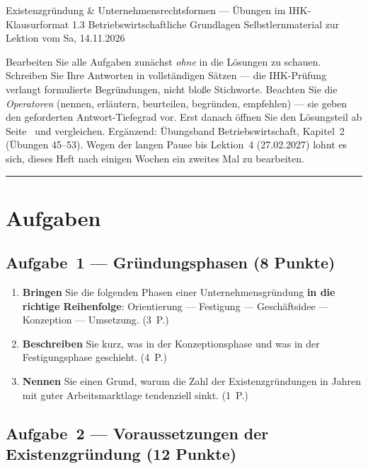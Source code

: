 \documentclass[11pt, a4paper]{article}
\begin{document}
%
  {Existenzgründung \& Unternehmensrechtsformen --- Übungen im IHK-Klausurformat}%
  {1.3 Betriebswirtschaftliche Grundlagen}%
  {Selbstlernmaterial zur Lektion vom Sa, 14.11.2026}


\begin{merksatz}[title={\bfseries So nutzen Sie dieses Aufgabenheft}]
Bearbeiten Sie alle Aufgaben zunächst \emph{ohne} in die Lösungen zu schauen. Schreiben
Sie Ihre Antworten in vollständigen Sätzen --- die IHK-Prüfung verlangt formulierte
Begründungen, nicht bloße Stichworte. Beachten Sie die \emph{Operatoren} (nennen,
erläutern, beurteilen, begründen, empfehlen) --- sie geben den geforderten
Antwort-Tiefegrad vor. Erst danach öffnen Sie den Lösungsteil ab
Seite~\pageref{loesungen} und vergleichen. Ergänzend: Übungsband Betriebswirtschaft,
Kapitel~2 (Übungen 45--53). Wegen der langen Pause bis Lektion~4 (27.02.2027) lohnt es
sich, dieses Heft nach einigen Wochen ein zweites Mal zu bearbeiten.
\end{merksatz}

\tableofcontents
\vspace{1em}
\hrule

\section{Aufgaben}

\subsection*{Aufgabe~1 --- Gründungsphasen (8 Punkte)}

\begin{enumerate}[label=(\alph*)]
  \item \textbf{Bringen} Sie die folgenden Phasen einer Unternehmensgründung \textbf{in
    die richtige Reihenfolge}: Orientierung --- Festigung --- Geschäftsidee ---
    Konzeption --- Umsetzung. \hfill (3~P.)
  \item \textbf{Beschreiben} Sie kurz, was in der Konzeptionsphase und was in der
    Festigungsphase geschieht. \hfill (4~P.)
  \item \textbf{Nennen} Sie einen Grund, warum die Zahl der Existenzgründungen in Jahren
    mit guter Arbeitsmarktlage tendenziell sinkt. \hfill (1~P.)
\end{enumerate}

\subsection*{Aufgabe~2 --- Voraussetzungen der Existenzgründung (12 Punkte)}
\end{document}
